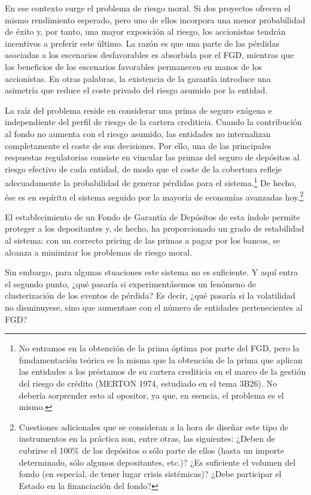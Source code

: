 \documentclass[10pt,a4paper]{article}
\begin{document}
En ese contexto surge el problema de riesgo moral. Si dos proyectos ofrecen el mismo rendimiento esperado, pero uno de ellos incorpora una menor probabilidad de éxito y, por tanto, una mayor exposición al riesgo, los accionistas tendrán incentivos a preferir este último. La razón es que una parte de las pérdidas asociadas a los escenarios desfavorables es absorbida por el FGD, mientras que los beneficios de los escenarios favorables permanecen en manos de los accionistas. En otras palabras, la existencia de la garantía introduce una asimetría que reduce el coste privado del riesgo asumido por la entidad.

La raíz del problema reside en considerar una prima de seguro exógena e independiente del perfil de riesgo de la cartera crediticia. Cuando la contribución al fondo no aumenta con el riesgo asumido, las entidades no internalizan completamente el coste de sus decisiones. Por ello, una de las principales respuestas regulatorias consiste en vincular las primas del seguro de depósitos al riesgo efectivo de cada entidad, de modo que el coste de la cobertura refleje adecuadamente la probabilidad de generar pérdidas para el sistema.\footnote{%
    No entramos en la obtención de la prima óptima por parte del FGD, pero la fundamentación teórica es la misma que la obtención de la prima que aplican las entidades a los préstamos de su cartera crediticia en el marco de la gestión del riesgo de crédito (MERTON 1974, estudiado en el tema 3B26). No debería sorprender esto al opositor, ya que, en esencia, el problema es el mismo.
} De hecho, ése es en espíritu el sistema seguido por la mayoría de economías avanzadas hoy.\footnote{%
    Cuestiones adicionales que se consideran a la hora de diseñar este tipo de instrumentos en la práctica son, entre otras, las siguientes: ¿Deben de cubrirse el 100\% de los depósitos o sólo parte de ellos (hasta un importe determinado, sólo algunos depositantes, etc.)? ¿Es suficiente el volumen del fondo (en especial, de tener lugar crisis sistémicas)? ¿Debe participar el Estado en la financiación del fondo?
}

El establecimiento de un Fondo de Garantía de Depósitos de esta índole permite proteger a los depositantes y, de hecho, ha proporcionado un grado de estabilidad al sistema: con un correcto pricing de las primas a pagar por los bancos, se alcanza a minimizar los problemas de riesgo moral. 

Sin embargo, para algunas stuaciones este sistema no es suficiente. Y aquí entra el segundo punto, ¿qué pasaría si experimentásemos un fenómeno de clusterización de los eventos de pérdida? Es decir, ¿qué pasaría si la volatilidad no disminuyese, sino que aumentase con el número de entidades pertenecientes al FGD?
\end{document}
